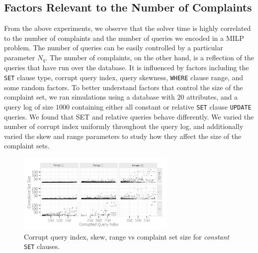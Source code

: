 \subsection{Factors Relevant to the Number of Complaints}

From the above experiments, we observe that the solver time is highly correlated to the number of complaints and the number of queries we encoded in a MILP problem. The number of queries can be easily controlled by a particular parameter $N_q$. The number of complaints, on the other hand, is a reflection of the queries that have run over the database. It is influenced by  factors including the \texttt{SET} clause type, corrupt query index, query skewness, \texttt{WHERE} clause range, and some random factors.   To better understand factors that control the size of the complaint set, we ran simulations using a database with $20$ attributes, and a query log of size $1000$ containing
either all constant or relative \texttt{SET} clause \texttt{UPDATE} queries. We found that SET and relative queries behave differently.
We varied the number of corrupt index uniformly throughout the query log, and additionally varied
the skew and range parameters to study how they affect the size of the complaint sets.



\begin{figure}[h]
\centering
\includegraphics[width = 3in]{figures/qidxsimulation/qidx_v_ncomplaints_20attrs_const}
\caption{Corrupt query index, skew, range vs complaint set size for \textit{constant} \texttt{SET} clauses.}
\label{f:qidx_v_ncomplaints_const} 
\end{figure}


